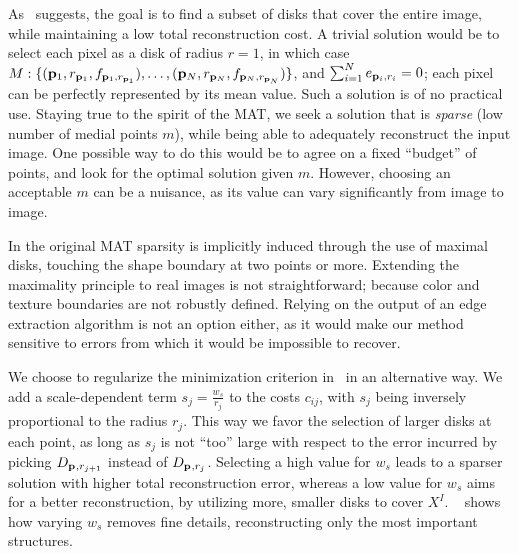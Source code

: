 \documentclass[10pt,twocolumn,letterpaper]{article}
\begin{document}
As~ suggests, the goal is to find a subset of disks that cover the entire image, while maintaining
a low total reconstruction cost. 
A trivial solution would be to select each pixel as a disk of radius $r=1$, in which case
$M:\{ (\mathbf{p}_{1},r_{\mathbf{p}_{1}},f_{\mathbf{p}_{1},r_{\mathbf{p}_{1}}}), \ldots, ( \mathbf{p}_{N},r_{\mathbf{p}_{N}},f_{\mathbf{p}_{N},r_{\mathbf{p}_{N}}} ) \}$,
and $\sum_{i=1}^N e_{\mathbf{p}_{i},r_i} = 0$; each pixel can be perfectly represented by its mean value.
Such a solution is of no practical use. 
Staying true to the spirit of the MAT, we seek a solution that is \emph{sparse}
(low number of medial points $m$), while being able to adequately reconstruct the input image.
One possible way to do this would be to agree on a fixed ``budget'' of points, and look for the 
optimal solution given $m$.
However, choosing an acceptable $m$ can be a nuisance, as its value can vary significantly  from image to image.

In the original MAT sparsity is implicitly induced through the use of maximal disks,
touching the shape boundary at two points or more.
Extending the maximality principle to real images is not straightforward;
because color and texture boundaries are not robustly defined.
Relying on the output of an edge extraction algorithm is not an option either,
as it would make our method sensitive to errors from which it would be impossible to recover.

We choose to regularize the minimization criterion in~ in an alternative way. 
We add a scale-dependent term $s_j = \frac{w_s}{r_j}$ to the costs $c_{ij}$, with $s_j$ 
being inversely proportional to the radius $r_j$.
This way we favor the selection of larger disks at each point, as long as $s_j$ is not ``too'' large
with respect to the error incurred by picking $D_{\mathbf{p}_{},r_{j+1}}$ instead of $D_{\mathbf{p}_{},r_j}$.
Selecting a high value for $w_s$ leads to a sparser solution with higher total reconstruction error,
whereas a low value for $w_s$ aims for a better reconstruction, by utilizing more, smaller disks
to cover $X^I$.
~ shows how varying $w_s$ removes fine details, reconstructing only the most important structures.
\end{document}
